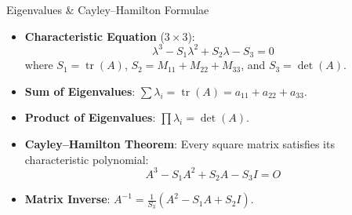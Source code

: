 \begin{formulabox}{Eigenvalues \& Cayley--Hamilton Formulae}
\begin{itemize}[leftmargin=1.5em]
    \item \textbf{Characteristic Equation} ($3 \times 3$):
    \begin{equation}
    \lambda^3 - S_1 \lambda^2 + S_2 \lambda - S_3 = 0
    \end{equation}
    where $S_1 = \operatorname{tr}(A)$, $S_2 = M_{11}+M_{22}+M_{33}$, and $S_3 = \det(A)$.
    \item \textbf{Sum of Eigenvalues}: $\sum \lambda_i = \operatorname{tr}(A) = a_{11}+a_{22}+a_{33}$.
    \item \textbf{Product of Eigenvalues}: $\prod \lambda_i = \det(A)$.
    \item \textbf{Cayley--Hamilton Theorem}: Every square matrix satisfies its characteristic polynomial:
    \begin{equation}
    A^3 - S_1 A^2 + S_2 A - S_3 I = O
    \end{equation}
    \item \textbf{Matrix Inverse}: $A^{-1} = \frac{1}{S_3}(A^2 - S_1 A + S_2 I)$.
\end{itemize}
\end{formulabox}
